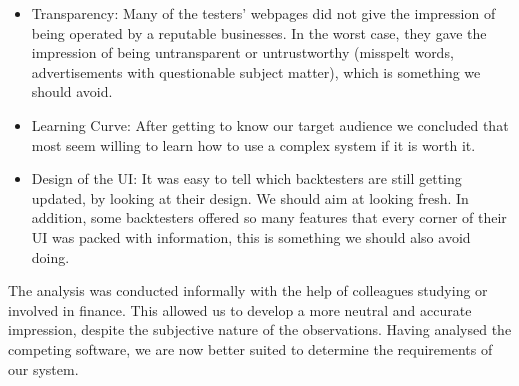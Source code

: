 \documentclass[main.tex]{subfiles}
\begin{document}
\begin{itemize}
    \item Transparency: Many of the testers' webpages did not give the impression of being operated by a reputable businesses. In the worst case, they gave the impression of being untransparent or untrustworthy (misspelt words, advertisements with questionable subject matter), which is something we should avoid.
    \item Learning Curve: After getting to know our target audience we concluded that most seem willing to learn how to use a complex system if it is worth it.
    \item Design of the UI: It was easy to tell which backtesters are still getting updated, by looking at their design. We should aim at looking fresh. In addition, some backtesters offered so many features that every corner of their UI was packed with information, this is something we should also avoid doing.
\end{itemize}

The analysis was conducted informally with the help of colleagues studying or involved in finance. This allowed us to develop a more neutral and accurate impression, despite the subjective nature of the observations. Having analysed the competing software, we are now better suited to determine the requirements of our system. 
\end{document}
